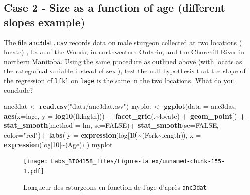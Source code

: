 \documentclass[
  12pt,
]{book}
\makeatletter
\newenvironment{Shaded}{\begin{snugshade}}{\end{snugshade}}
\newcommand{\DataTypeTok}[1]{\textcolor[rgb]{0.13,0.29,0.53}{#1}}
\newcommand{\DecValTok}[1]{\textcolor[rgb]{0.00,0.00,0.81}{#1}}
\newcommand{\KeywordTok}[1]{\textcolor[rgb]{0.13,0.29,0.53}{\textbf{#1}}}
\newcommand{\NormalTok}[1]{#1}
\newcommand{\OperatorTok}[1]{\textcolor[rgb]{0.81,0.36,0.00}{\textbf{#1}}}
\newcommand{\OtherTok}[1]{\textcolor[rgb]{0.56,0.35,0.01}{#1}}
\newcommand{\StringTok}[1]{\textcolor[rgb]{0.31,0.60,0.02}{#1}}
\newenvironment{kframe}{%
\medskip{}
\setlength{\fboxsep}{.8em}
\def\at@end@of@kframe{}%
\ifinner\ifhmode%
 \def\at@end@of@kframe{\end{minipage}}%
 \begin{minipage}{\columnwidth}%
\fi\fi%
\def\FrameCommand##1{\hskip\@totalleftmargin \hskip-\fboxsep
\colorbox{incolor}{##1}\hskip-\fboxsep
    \hskip-\linewidth \hskip-\@totalleftmargin \hskip\columnwidth}%
\MakeFramed {\advance\hsize-\width
  \@totalleftmargin\z@ \linewidth\hsize
  \@setminipage}}%
{\par\unskip\endMakeFramed%
\at@end@of@kframe}
\newenvironment{rmdblock}[1]
 {
 \begin{itemize}
 \renewcommand{\labelitemi}{
   \raisebox{-.7\height}[0pt][0pt]{
     {\setkeys{Gin}{width=3em,keepaspectratio}\texttt{[image: images/\#1]}}
   }
 }
 \begin{kframe}
 \setlength{\fboxsep}{1em}
 \item
 }
 {
 \end{kframe}
 \end{itemize}
 }
\newenvironment{rmdcode}
  {\begin{rmdblock}{screen}}
  {\end{rmdblock}}
\makeatother
\begin{document}
\hypertarget{case-2---size-as-a-function-of-age-different-slopes-example}{%
\subsection{Case 2 - Size as a function of age (different slopes example)}\label{case-2---size-as-a-function-of-age-different-slopes-example}}

\begin{rmdcode}
The file \texttt{anc3dat.csv} records data on male sturgeon collected at two locations ( locate) , Lake of the Woods, in northwestern Ontario, and the Churchill River in northern Manitoba. Using the same procedure as outlined above (with locate as the categorical variable instead of sex ), test the null hypothesis that the slope of the regression of \texttt{lfkl} on \texttt{lage} is the same in the two locations. What do you conclude?
\end{rmdcode}

\begin{Shaded}
\begin{Highlighting}[]
\NormalTok{anc3dat \textless{}{-}}\StringTok{ }\KeywordTok{read.csv}\NormalTok{(}\StringTok{"data/anc3dat.csv"}\NormalTok{)}
\NormalTok{myplot \textless{}{-}}\StringTok{ }\KeywordTok{ggplot}\NormalTok{(}\DataTypeTok{data =}\NormalTok{ anc3dat, }\KeywordTok{aes}\NormalTok{(}\DataTypeTok{x=}\NormalTok{lage, }\DataTypeTok{y =} \KeywordTok{log10}\NormalTok{(fklngth))) }\OperatorTok{+}
\StringTok{  }\KeywordTok{facet\_grid}\NormalTok{(.}\OperatorTok{\textasciitilde{}}\NormalTok{locate) }\OperatorTok{+}
\StringTok{  }\KeywordTok{geom\_point}\NormalTok{() }\OperatorTok{+}
\StringTok{  }\KeywordTok{stat\_smooth}\NormalTok{(}\DataTypeTok{method =}\NormalTok{ lm, }\DataTypeTok{se=}\OtherTok{FALSE}\NormalTok{)}\OperatorTok{+}
\StringTok{  }\KeywordTok{stat\_smooth}\NormalTok{(}\DataTypeTok{se=}\OtherTok{FALSE}\NormalTok{, }\DataTypeTok{color=}\StringTok{"red"}\NormalTok{)}\OperatorTok{+}
\StringTok{  }\KeywordTok{labs}\NormalTok{(}
    \DataTypeTok{y =} \KeywordTok{expression}\NormalTok{(log[}\DecValTok{10}\NormalTok{]}\OperatorTok{\textasciitilde{}}\NormalTok{(Fork}\OperatorTok{\textasciitilde{}}\NormalTok{length)),}
    \DataTypeTok{x =} \KeywordTok{expression}\NormalTok{(log[}\DecValTok{10}\NormalTok{]}\OperatorTok{\textasciitilde{}}\NormalTok{(Age))}
\NormalTok{)}
\NormalTok{myplot}
\end{Highlighting}
\end{Shaded}

\begin{figure}
\centering
\texttt{[image: Labs\_BIO4158\_files/figure-latex/unnamed-chunk-155-1.pdf]}
\caption{\label{fig:unnamed-chunk-155}Longueur des esturgeons en fonction de l'age d'après \texttt{anc3dat}}
\end{figure}
\end{document}
